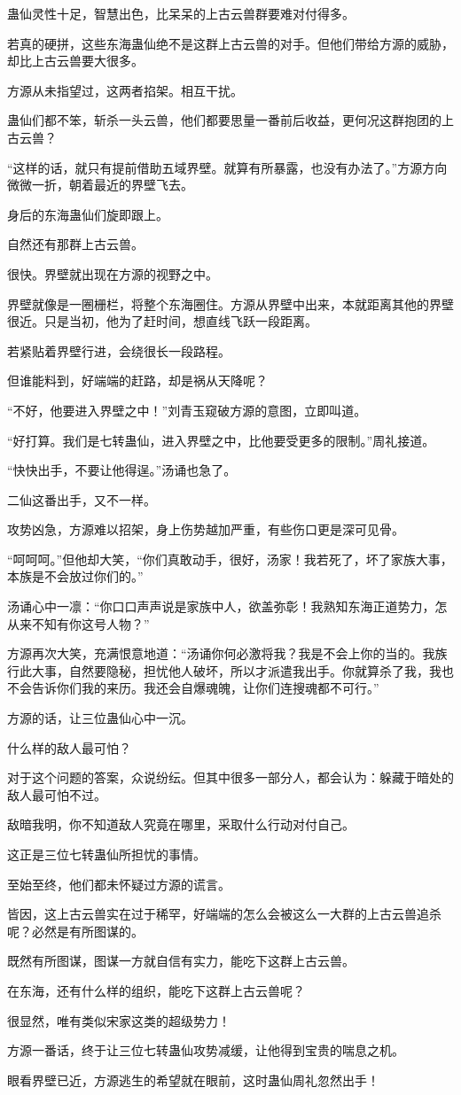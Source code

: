 \begin{this_body}
蛊仙灵性十足，智慧出色，比呆呆的上古云兽群要难对付得多。

若真的硬拼，这些东海蛊仙绝不是这群上古云兽的对手。但他们带给方源的威胁，却比上古云兽要大很多。

方源从未指望过，这两者掐架。相互干扰。

蛊仙们都不笨，斩杀一头云兽，他们都要思量一番前后收益，更何况这群抱团的上古云兽？

“这样的话，就只有提前借助五域界壁。就算有所暴露，也没有办法了。”方源方向微微一折，朝着最近的界壁飞去。

身后的东海蛊仙们旋即跟上。

自然还有那群上古云兽。

很快。界壁就出现在方源的视野之中。

界壁就像是一圈栅栏，将整个东海圈住。方源从界壁中出来，本就距离其他的界壁很近。只是当初，他为了赶时间，想直线飞跃一段距离。

若紧贴着界壁行进，会绕很长一段路程。

但谁能料到，好端端的赶路，却是祸从天降呢？

“不好，他要进入界壁之中！”刘青玉窥破方源的意图，立即叫道。

“好打算。我们是七转蛊仙，进入界壁之中，比他要受更多的限制。”周礼接道。

“快快出手，不要让他得逞。”汤诵也急了。

二仙这番出手，又不一样。

攻势凶急，方源难以招架，身上伤势越加严重，有些伤口更是深可见骨。

“呵呵呵。”但他却大笑，“你们真敢动手，很好，汤家！我若死了，坏了家族大事，本族是不会放过你们的。”

汤诵心中一凛：“你口口声声说是家族中人，欲盖弥彰！我熟知东海正道势力，怎从来不知有你这号人物？”

方源再次大笑，充满恨意地道：“汤诵你何必激将我？我是不会上你的当的。我族行此大事，自然要隐秘，担忧他人破坏，所以才派遣我出手。你就算杀了我，我也不会告诉你们我的来历。我还会自爆魂魄，让你们连搜魂都不可行。”

方源的话，让三位蛊仙心中一沉。

什么样的敌人最可怕？

对于这个问题的答案，众说纷纭。但其中很多一部分人，都会认为：躲藏于暗处的敌人最可怕不过。

敌暗我明，你不知道敌人究竟在哪里，采取什么行动对付自己。

这正是三位七转蛊仙所担忧的事情。

至始至终，他们都未怀疑过方源的谎言。

皆因，这上古云兽实在过于稀罕，好端端的怎么会被这么一大群的上古云兽追杀呢？必然是有所图谋的。

既然有所图谋，图谋一方就自信有实力，能吃下这群上古云兽。

在东海，还有什么样的组织，能吃下这群上古云兽呢？

很显然，唯有类似宋家这类的超级势力！

方源一番话，终于让三位七转蛊仙攻势减缓，让他得到宝贵的喘息之机。

眼看界壁已近，方源逃生的希望就在眼前，这时蛊仙周礼忽然出手！

\end{this_body}

